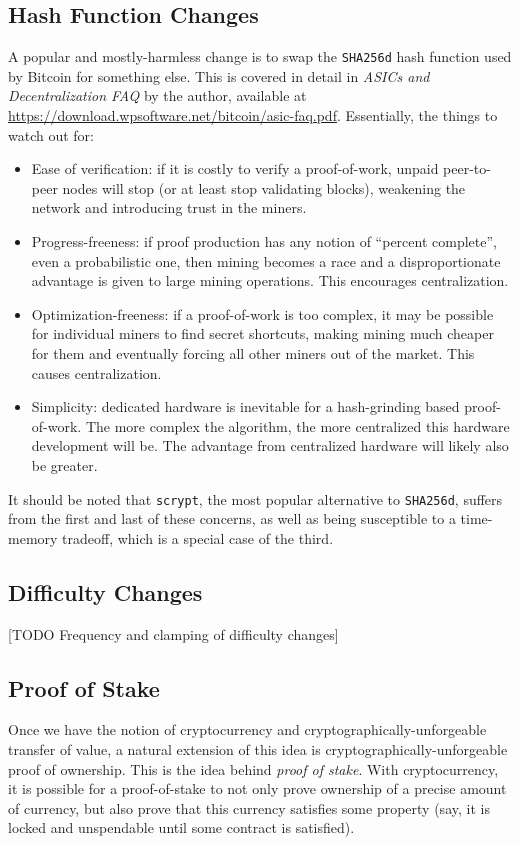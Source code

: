 \documentclass[letterpaper]{article}
\begin{document}
\subsection{Hash Function Changes}
A popular and mostly-harmless change is to
swap the \texttt{SHA256d} hash function used by Bitcoin for something else. This
is covered in detail in \emph{ASICs and Decentralization FAQ} by the author,
available at \url{https://download.wpsoftware.net/bitcoin/asic-faq.pdf}.
Essentially, the things to watch out for:
\begin{itemize}
\item Ease of verification: if it is costly to verify a proof-of-work, unpaid
peer-to-peer nodes will stop (or at least stop validating blocks), weakening
the network and introducing trust in the miners.
\item Progress-freeness: if proof production has any notion of ``percent
complete'', even a probabilistic one, then mining becomes a race and a disproportionate
advantage is given to large mining operations. This encourages centralization.
\item Optimization-freeness: if a proof-of-work is too complex, it may be possible
for individual miners to find secret shortcuts, making mining much cheaper for them
and eventually forcing all other miners out of the market. This causes centralization.
\item Simplicity: dedicated hardware is inevitable for a hash-grinding based
proof-of-work. The more complex the algorithm, the more centralized this hardware
development will be. The advantage from centralized hardware will likely also be
greater.
\end{itemize}
It should be noted that \texttt{scrypt}, the most popular alternative to
\texttt{SHA256d}, suffers from the first and last of these concerns, as
well as being susceptible to a time-memory tradeoff, which is a special
case of the third.

\subsection{Difficulty Changes}

[TODO Frequency and clamping of difficulty changes]

\subsection{Proof of Stake\label{secpos}}

Once we have the notion of cryptocurrency and cryptographically-unforgeable
transfer of value, a natural extension of this idea is cryptographically-unforgeable
proof of ownership. This is the idea behind \emph{proof of stake}. With cryptocurrency,
it is possible for a proof-of-stake to not only prove ownership of a precise
amount of currency, but also prove that this currency satisfies some property
(say, it is locked and unspendable until some contract is satisfied).
\end{document}
